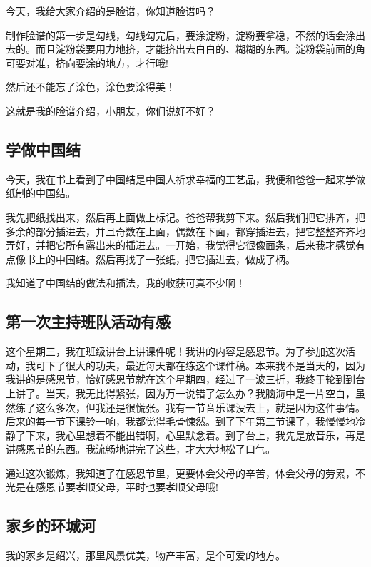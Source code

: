 \documentclass[UTF8,a4paper,titlepage,twoside,10.5pt]{article}
\begin{document}
今天，我给大家介绍的是脸谱，你知道脸谱吗？

制作脸谱的第一步是勾线，勾线勾完后，要涂淀粉，淀粉要拿稳，不然的话会涂出去的。而且淀粉袋要用力地挤，才能挤出去白白的、糊糊的东西。淀粉袋前面的角可要对准，挤向要涂的地方，才行哦!

然后还不能忘了涂色，涂色要涂得美！

这就是我的脸谱介绍，小朋友，你们说好不好？

\subsection{学做中国结}
\label{sec:org8ae0150}

今天，我在书上看到了中国结是中国人祈求幸福的工艺品，我便和爸爸一起来学做纸制的中国结。

我先把纸找出来，然后再上面做上标记。爸爸帮我剪下来。然后我们把它排齐，把多余的部分插进去，并且奇数在上面，偶数在下面，都穿插进去，把它整整齐齐地弄好，并把它所有露出来的插进去。一开始，我觉得它很像面条，后来我才感觉有点像书上的中国结。然后再找了一张纸，把它插进去，做成了柄。

我知道了中国结的做法和插法，我的收获可真不少啊！

\subsection{第一次主持班队活动有感}
\label{sec:org4927713}

这个星期三，我在班级讲台上讲课件呢！我讲的内容是感恩节。为了参加这次活动，我可下了很大的功夫，最近每天都在练这个课件稿。本来我不是当天的，因为我讲的是感恩节，恰好感恩节就在这个星期四，经过了一波三折，我终于轮到到台上讲了。当天，我无比得紧张，因为万一说错了怎么办？我脑海中是一片空白，虽然练了这么多次，但我还是很慌张。我有一节音乐课没去上，就是因为这件事情。后来的每一节下课铃一响，我都觉得毛骨悚然。到了下午第三节课了，我慢慢地冷静了下来，我心里想着不能出错啊，心里默念着。到了台上，我先是放音乐，再是讲感恩节的东西。我流畅地讲完了这些，才大大地松了口气。

通过这次锻炼，我知道了在感恩节里，更要体会父母的辛苦，体会父母的劳累，不光是在感恩节要孝顺父母，平时也要孝顺父母哦!

\subsection{家乡的环城河}
\label{sec:org86666fd}

我的家乡是绍兴，那里风景优美，物产丰富，是个可爱的地方。
\end{document}
